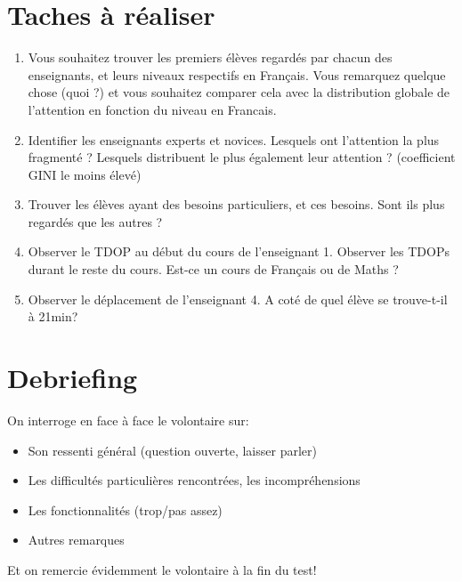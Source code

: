 \documentclass{article}
\begin{document}
\section{Taches à réaliser}
\begin{enumerate}
    \item Vous souhaitez trouver les premiers élèves regardés par chacun des enseignants, et leurs niveaux respectifs en Français. Vous remarquez quelque chose (quoi ?) et vous souhaitez comparer cela avec la distribution globale de l'attention en fonction du niveau en Francais.

    \item Identifier les enseignants experts et novices. Lesquels ont l'attention la plus fragmenté ? Lesquels distribuent le plus également leur attention ? (coefficient GINI le moins élevé)

    \item Trouver les élèves ayant des besoins particuliers, et ces besoins. Sont ils plus regardés que les autres ?

    \item Observer le TDOP au début du cours de l'enseignant 1. Observer les TDOPs durant le reste du cours. Est-ce un cours de Français ou de Maths ?

    \item Observer le déplacement de l'enseignant 4. A coté de quel élève se trouve-t-il à 21min?
\end{enumerate}

\section{Debriefing}
On interroge en face à face le volontaire sur:
\begin{itemize}
    \item Son ressenti général (question ouverte, laisser parler)
    \item Les difficultés particulières rencontrées, les incompréhensions
    \item Les fonctionnalités (trop/pas assez)
    \item Autres remarques
\end{itemize}

Et on remercie évidemment le volontaire à la fin du test!
\end{document}
